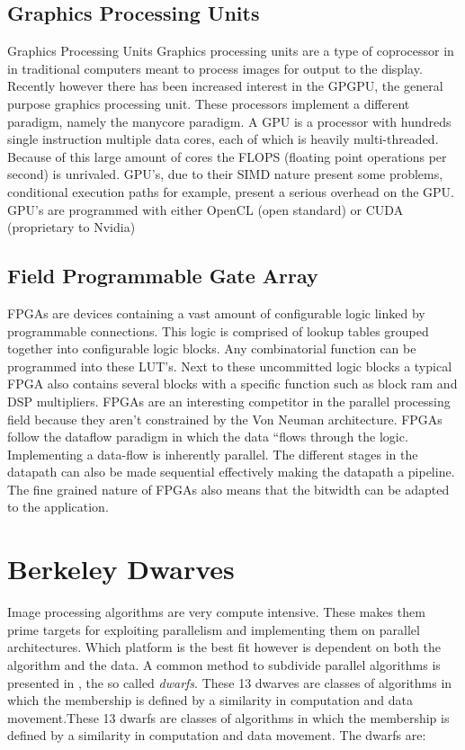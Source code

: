 \subsection{Graphics Processing Units} Graphics Processing Units
Graphics processing units are a type of coprocessor in in traditional computers meant to process images for output to the display. Recently however there has been increased interest in the GPGPU, the general purpose graphics processing unit. These processors implement a different paradigm, namely the manycore paradigm. A  GPU is a processor with hundreds single instruction multiple data cores, each of which is heavily multi-threaded. Because of this large amount of cores the FLOPS (floating point operations per second) is unrivaled\cite{kirk_programming_2010}. GPU's, due to their SIMD nature present some problems, conditional execution paths for example, present a serious overhead on the GPU. GPU's are programmed with either OpenCL (open standard) or CUDA (proprietary to Nvidia)

\subsection{Field Programmable Gate Array} 
FPGAs are devices containing a vast amount of configurable logic linked by programmable connections. This logic is comprised of lookup tables grouped together into configurable logic blocks. Any combinatorial function can be programmed into these LUT's. Next to these uncommitted logic blocks a typical FPGA also contains several blocks with a specific function such as block ram and DSP multipliers. FPGAs are an interesting competitor in the parallel processing field because they aren't constrained by the Von Neuman architecture. FPGAs follow the dataflow paradigm in which the data “flows through the logic. Implementing a data-flow is inherently parallel. The different stages in the datapath can also be made sequential effectively making the datapath a pipeline. The fine grained nature of FPGAs also means that the bitwidth can be adapted to the application.


\section{Berkeley Dwarves}

Image processing algorithms are very compute intensive. These makes them prime targets for exploiting parallelism and implementing them on parallel architectures. Which platform is the best fit however is dependent on both the algorithm and the data. A common method to subdivide parallel algorithms is presented in , the so called \emph{dwarfs}. These 13 dwarves are classes of algorithms in which the membership is defined by a similarity in computation and data movement.These 13 dwarfs are classes of algorithms in which the membership is defined by a similarity in computation and data movement.
The dwarfs are:

